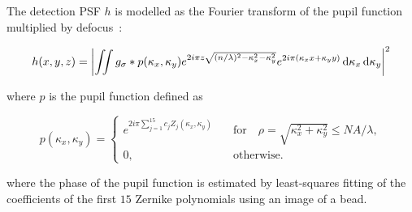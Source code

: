 \documentclass[a0paper,portrait,fontscale=0.35]{baposter}
\theoremstyle{plain}
\theoremstyle{plain}
\theoremstyle{definition}
\theoremstyle{plain}
\theoremstyle{definition}
\begin{document}
\begin{poster}
{  \begin{minipage}[t]{\textwidth}
    The detection PSF $h$ is modelled as the Fourier
    transform of the pupil function multiplied by 
    defocus~\cite{Stokseth1969}: 
    \begin{tcolorbox}[colback=teal!10!white,colframe=white]
      \vspace{-1em}
      \begin{equation}
        h(x,y,z) = \left|
          \iint g_{\sigma} * p(\kappa_x,\kappa_y) e^{
            2 i \pi z 
            \sqrt{(n/\lambda)^2 - \kappa_x^2 - \kappa_y^2}
          }
          e^{
            2 i \pi (\kappa_x x + \kappa_y y)
          }
          \dif \kappa_x \dif \kappa_y
        \right|^2
        \label{eq:psf model}
      \end{equation}
    \end{tcolorbox}
    where $p$ is the pupil function defined as
    \begin{tcolorbox}[colback=teal!10!white,colframe=white]
      \begin{equation}
        p(\kappa_x,\kappa_y) = \begin{cases}
          e^{2i\pi \sum_{j=1}^{15} c_j Z_j(\kappa_x,\kappa_y)}
          \quad
            &\text{for} \quad
            \rho = \sqrt{\kappa_x^2 + \kappa_y^2} \leq NA/\lambda,\\
            0, \quad &\text{otherwise.}
        \end{cases}
      \end{equation}
    \end{tcolorbox}
    where the phase of the pupil function is estimated by least-squares
    fitting of the coefficients of the first $15$ Zernike polynomials
    using an image of a bead.
  \end{minipage}

}
\end{poster}
\end{document}
